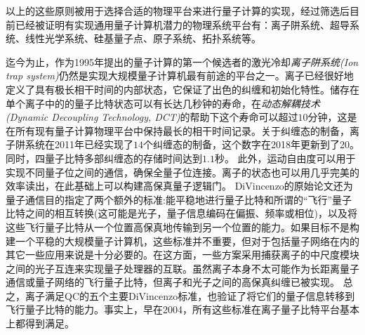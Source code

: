 以上的这些原则被用于选择合适的物理平台来进行量子计算的实现，经过筛选后目前已经被证明有实现通用量子计算机潜力的物理系统平台有：离子阱系统、超导系统、线性光学系统、硅基量子点、原子系统、拓扑系统等。

迄今为止，作为1995年提出的量子计算的第一个候选者的激光冷却\emph{离子阱系统(Ion trap system)}仍然是实现大规模量子计算机最有前途的平台之一。离子已经很好地定义了具有极长相干时间\cite[]{Fisk_Sellars_Lawn_Coles_1997}的内部状态，它保证了出色的纠缠和初始化特性\cite[]{Blatt_Wineland_2008}。储存在单个离子中的的量子比特状态可以有长达几秒钟的寿命\cite[]{Langer_Ozeri_Jost_Chiaverini_DeMarco_Ben_Kish_Blakestad_Britton_Hume_Itano_et_al_2005}，在\emph{动态解耦技术(Dynamic Decoupling Technology, DCT)}的帮助下这个寿命可以超过$10$分钟\cite[]{Wang_Um_Zhang_An_Lyu_Zhang_Duan_Yum_Kim_2017}，这是在所有现有量子计算物理平台中保持最长的相干时间记录。关于纠缠态的制备，离子阱系统在2011年已经实现了$14$个纠缠态的制备\cite[]{Monz_Schindler_Barreiro_Chwalla_Nigg_Coish_Harlander_Hänsel_Hennrich_Blatt_2011}，这个数字在2018年更新到了20\cite[]{Friis_Marty_Maier_Hempel_Holzäpfel_Jurcevic_Plenio_Huber_Roos_Blatt_et_al_2018}。同时，四量子比特多部纠缠态的存储时间达到$1.1$秒\cite[]{Kaufmann_Ruster_Schmiegelow_Luda_Kaushal_Schulz_von_Lindenfels_Schmidt_Kaler_Poschinger_2017}。
此外，运动自由度可以用于实现不同量子位之间的通信，确保全量子位连接\cite[]{Debnath_Linke_Figgatt_Landsman_Wright_Monroe_2016}。离子的状态也可以用几乎完美的效率读出\cite[]{Myerson_Szwer_Webster_Allcock_Curtis_Imreh_Sherman_Stacey_Steane_Lucas_2008}，在此基础上可以构建高保真量子逻辑门\cite[]{Ballance_Harty_Linke_Sepiol_Lucas_2016}。
DiVincenzo的原始论文还为量子通信目的指定了两个额外的标准:能平稳地进行量子比特和所谓的“飞行”量子比特之间的相互转换(这可能是光子，量子信息编码在偏振、频率或相位)，以及将这些飞行量子比特从一个位置高保真地传输到另一个位置的能力。如果目标不是构建一个平稳的大规模量子计算机，这些标准并不重要，但对于包括量子网络在内的其它一些应用来说是十分必要的。在这方面，一些方案采用捕获离子的中尺度模块之间的光子互连来实现量子处理器的互联\cite[]{Monroe_Raussendorf_Ruthven_Brown_Maunz_Duan_Kim_2014}。虽然离子本身不太可能作为长距离量子通信或量子网络的飞行量子比特，但离子和光子之间的高保真纠缠已被实现\cite[]{Moehring_Blinov_Madsen_Duan_Monroe_2004}。
总之，离子满足QC的五个主要DiVincenzo标准，也验证了将它们的量子信息转移到飞行量子比特的能力。事实上，早在2004，所有这些标准在离子量子比特平台基本上都得到满足\cite[]{Leibfried_DeMarco_Meyer_Lucas_Barrett_Britton_Itano_Jelenković_Langer_Rosenband_et_al_2003,Moehring_Blinov_Madsen_Duan_Monroe_2004}。

